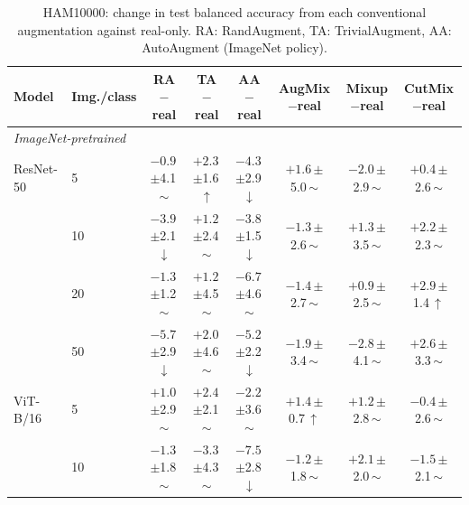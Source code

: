\begin{table}[htbp]
\centering
\footnotesize
\setlength{\tabcolsep}{4pt}
\caption{HAM10000: change in test balanced accuracy from each conventional augmentation against real-only. RA: RandAugment, TA: TrivialAugment, AA: AutoAugment (ImageNet policy).}
\label{tab:paper-ham10000-conventional}
\begin{tabular}{llcccccc}
\toprule
Model & Img./class & \shortstack{RA\\$-$real} & \shortstack{TA\\$-$real} & \shortstack{AA\\$-$real} & \shortstack{AugMix\\$-$real} & \shortstack{Mixup\\$-$real} & \shortstack{CutMix\\$-$real} \\
\midrule
\multicolumn{8}{l}{\textit{ImageNet-pretrained}} \\
ResNet-50 & 5 & $-0.9$\,{\scriptsize$\pm$4.1}\,$\sim$ & $+2.3$\,{\scriptsize$\pm$1.6}\,$\uparrow$ & $-4.3$\,{\scriptsize$\pm$2.9}\,$\downarrow$ & $+1.6$\,{\scriptsize$\pm$5.0}\,$\sim$ & $-2.0$\,{\scriptsize$\pm$2.9}\,$\sim$ & $+0.4$\,{\scriptsize$\pm$2.6}\,$\sim$ \\
 & 10 & $-3.9$\,{\scriptsize$\pm$2.1}\,$\downarrow$ & $+1.2$\,{\scriptsize$\pm$2.4}\,$\sim$ & $-3.8$\,{\scriptsize$\pm$1.5}\,$\downarrow$ & $-1.3$\,{\scriptsize$\pm$2.6}\,$\sim$ & $+1.3$\,{\scriptsize$\pm$3.5}\,$\sim$ & $+2.2$\,{\scriptsize$\pm$2.3}\,$\sim$ \\
 & 20 & $-1.3$\,{\scriptsize$\pm$1.2}\,$\sim$ & $+1.2$\,{\scriptsize$\pm$4.5}\,$\sim$ & $-6.7$\,{\scriptsize$\pm$4.6}\,$\sim$ & $-1.4$\,{\scriptsize$\pm$2.7}\,$\sim$ & $+0.9$\,{\scriptsize$\pm$2.5}\,$\sim$ & $+2.9$\,{\scriptsize$\pm$1.4}\,$\uparrow$ \\
 & 50 & $-5.7$\,{\scriptsize$\pm$2.9}\,$\downarrow$ & $+2.0$\,{\scriptsize$\pm$4.6}\,$\sim$ & $-5.2$\,{\scriptsize$\pm$2.2}\,$\downarrow$ & $-1.9$\,{\scriptsize$\pm$3.4}\,$\sim$ & $-2.8$\,{\scriptsize$\pm$4.1}\,$\sim$ & $+2.6$\,{\scriptsize$\pm$3.3}\,$\sim$ \\
\addlinespace[2pt]
ViT-B/16 & 5 & $+1.0$\,{\scriptsize$\pm$2.9}\,$\sim$ & $+2.4$\,{\scriptsize$\pm$2.1}\,$\sim$ & $-2.2$\,{\scriptsize$\pm$3.6}\,$\sim$ & $+1.4$\,{\scriptsize$\pm$0.7}\,$\uparrow$ & $+1.2$\,{\scriptsize$\pm$2.8}\,$\sim$ & $-0.4$\,{\scriptsize$\pm$2.6}\,$\sim$ \\
 & 10 & $-1.3$\,{\scriptsize$\pm$1.8}\,$\sim$ & $-3.3$\,{\scriptsize$\pm$4.3}\,$\sim$ & $-7.5$\,{\scriptsize$\pm$2.8}\,$\downarrow$ & $-1.2$\,{\scriptsize$\pm$1.8}\,$\sim$ & $+2.1$\,{\scriptsize$\pm$2.0}\,$\sim$ & $-1.5$\,{\scriptsize$\pm$2.1}\,$\sim$ \\

\end{tabular}
\end{table}
